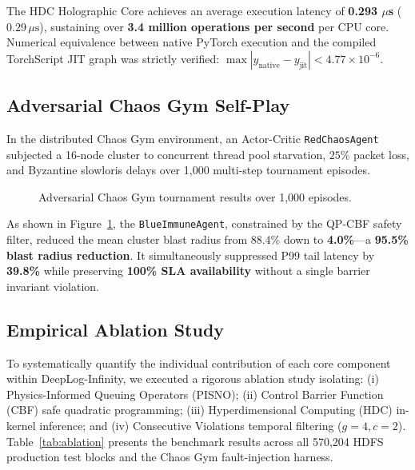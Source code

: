 \documentclass[letterpaper,twocolumn,10pt]{article}
\begin{document}
The HDC Holographic Core achieves an average execution latency of \textbf{0.293 $\mu$s} ($0.29\,\mu\text{s}$), sustaining over \textbf{3.4 million operations per second} per CPU core. Numerical equivalence between native PyTorch execution and the compiled TorchScript JIT graph was strictly verified: $\max |y_{\text{native}} - y_{\text{jit}}| < 4.77 \times 10^{-6}$.

\subsection{Adversarial Chaos Gym Self-Play}
In the distributed Chaos Gym environment, an Actor-Critic \texttt{Red\allowbreak Chaos\allowbreak Agent} subjected a 16-node cluster to concurrent thread pool starvation, $25\%$ packet loss, and Byzantine slowloris delays over 1,000 multi-step tournament episodes.

\begin{figure}[t]
\centering
\footnotesize
\setlength{\tabcolsep}{2.5pt}
\caption{Adversarial Chaos Gym tournament results over 1,000 episodes.}
\label{fig:chaos_results}
\end{figure}

As shown in Figure~\ref{fig:chaos_results}, the \texttt{Blue\allowbreak Immune\allowbreak Agent}, constrained by the QP-CBF safety filter, reduced the mean cluster blast radius from 88.4\% down to \textbf{4.0\%}---a \textbf{95.5\% blast radius reduction}. It simultaneously suppressed P99 tail latency by \textbf{39.8\%} while preserving \textbf{100\% SLA availability} without a single barrier invariant violation.

\subsection{Empirical Ablation Study}
\label{sec:ablation}
To systematically quantify the individual contribution of each core component within DeepLog-Infinity, we executed a rigorous ablation study isolating: (i) Physics-Informed Queuing Operators (PISNO); (ii) Control Barrier Function (CBF) safe quadratic programming; (iii) Hyperdimensional Computing (HDC) in-kernel inference; and (iv) Consecutive Violations temporal filtering ($g=4, c=2$). Table~\ref{tab:ablation} presents the benchmark results across all 570,204 HDFS production test blocks and the Chaos Gym fault-injection harness.
\end{document}
